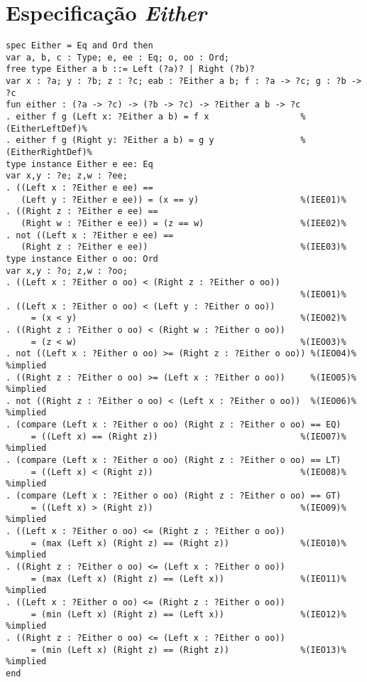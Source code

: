 \section{Especificação \textit{Either}}
\label{appendix:lazySpec:either}
\begin{Verbatim}
spec Either = Eq and Ord then
var a, b, c : Type; e, ee : Eq; o, oo : Ord;
free type Either a b ::= Left (?a)? | Right (?b)?     
var x : ?a; y : ?b; z : ?c; eab : ?Either a b; f : ?a -> ?c; g : ?b -> ?c
fun either : (?a -> ?c) -> (?b -> ?c) -> ?Either a b -> ?c
. either f g (Left x: ?Either a b) = f x                  %(EitherLeftDef)%
. either f g (Right y: ?Either a b) = g y                 %(EitherRightDef)%
type instance Either e ee: Eq
var x,y : ?e; z,w : ?ee;
. ((Left x : ?Either e ee) == 
   (Left y : ?Either e ee)) = (x == y)                    %(IEE01)%
. ((Right z : ?Either e ee) ==
   (Right w : ?Either e ee)) = (z == w)                   %(IEE02)%
. not ((Left x : ?Either e ee) ==
   (Right z : ?Either e ee))                              %(IEE03)%
type instance Either o oo: Ord
var x,y : ?o; z,w : ?oo;
. ((Left x : ?Either o oo) < (Right z : ?Either o oo))
                                                          %(IEO01)%
. ((Left x : ?Either o oo) < (Left y : ?Either o oo))
     = (x < y)                                            %(IEO02)%
. ((Right z : ?Either o oo) < (Right w : ?Either o oo))
     = (z < w)                                            %(IEO03)%
. not ((Left x : ?Either o oo) >= (Right z : ?Either o oo)) %(IEO04)% %implied
. ((Right z : ?Either o oo) >= (Left x : ?Either o oo))     %(IEO05)% %implied
. not ((Right z : ?Either o oo) < (Left x : ?Either o oo))  %(IEO06)% %implied
. (compare (Left x : ?Either o oo) (Right z : ?Either o oo) == EQ)
     = ((Left x) == (Right z))                            %(IEO07)% %implied
. (compare (Left x : ?Either o oo) (Right z : ?Either o oo) == LT)
     = ((Left x) < (Right z))                             %(IEO08)% %implied
. (compare (Left x : ?Either o oo) (Right z : ?Either o oo) == GT)
     = ((Left x) > (Right z))                             %(IEO09)% %implied
. ((Left x : ?Either o oo) <= (Right z : ?Either o oo))
     = (max (Left x) (Right z) == (Right z))              %(IEO10)% %implied
. ((Right z : ?Either o oo) <= (Left x : ?Either o oo))
     = (max (Left x) (Right z) == (Left x))               %(IEO11)% %implied
. ((Left x : ?Either o oo) <= (Right z : ?Either o oo))
     = (min (Left x) (Right z) == (Left x))               %(IEO12)% %implied
. ((Right z : ?Either o oo) <= (Left x : ?Either o oo))
     = (min (Left x) (Right z) == (Right z))              %(IEO13)% %implied
end
\end{Verbatim}

